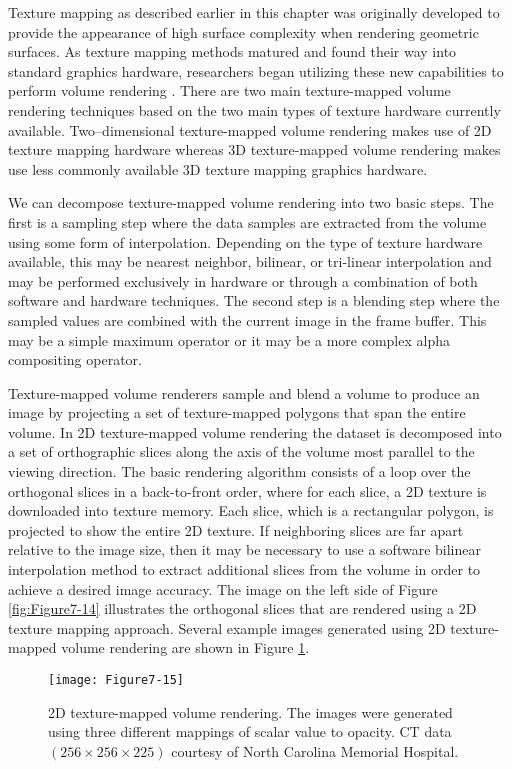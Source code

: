 Texture mapping as described earlier in this chapter was originally developed to provide the appearance of high surface complexity when rendering geometric surfaces. As texture mapping methods matured and found their way into standard graphics hardware, researchers began utilizing these new capabilities to perform volume rendering \cite{Cabral94}. There are two main texture-mapped volume rendering techniques based on the two main types of texture hardware currently available. Two--dimensional texture-mapped volume rendering makes use of 2D texture mapping hardware whereas 3D texture-mapped volume rendering makes use less commonly available 3D texture mapping graphics hardware.

We can decompose texture-mapped volume rendering into two basic steps. The first is a sampling step where the data samples are extracted from the volume using some form of interpolation. Depending on the type of texture hardware available, this may be nearest neighbor, bilinear, or tri-linear interpolation and may be performed exclusively in hardware or through a combination of both software and hardware techniques. The second step is a blending step where the sampled values are combined with the current image in the frame buffer. This may be a simple maximum operator or it may be a more complex alpha compositing operator.

Texture-mapped volume renderers sample and blend a volume to produce an image by projecting a set of texture-mapped polygons that span the entire volume. In 2D texture-mapped volume rendering the dataset is decomposed into a set of orthographic slices along the axis of the volume most parallel to the viewing direction. The basic rendering algorithm consists of a loop over the orthogonal slices in a back-to-front order, where for each slice, a 2D texture is downloaded into texture memory. Each slice, which is a rectangular polygon, is projected to show the entire 2D texture. If neighboring slices are far apart relative to the image size, then it may be necessary to use a software bilinear interpolation method to extract additional slices from the volume in order to achieve a desired image accuracy. The image on the left side of Figure \ref{fig:Figure7-14} illustrates the orthogonal slices that are rendered using a 2D texture mapping approach. Several example images generated using 2D texture-mapped volume rendering are shown in Figure \ref{fig:Figure7-15}.

\begin{figure}[!htb]
	\texttt{[image: Figure7-15]}
	\caption{2D texture-mapped volume rendering. The images were generated using three different mappings of scalar value to opacity. CT data $(256 \times 256 \times 225)$ courtesy of North Carolina Memorial Hospital.}\label{fig:Figure7-15}
\end{figure}

